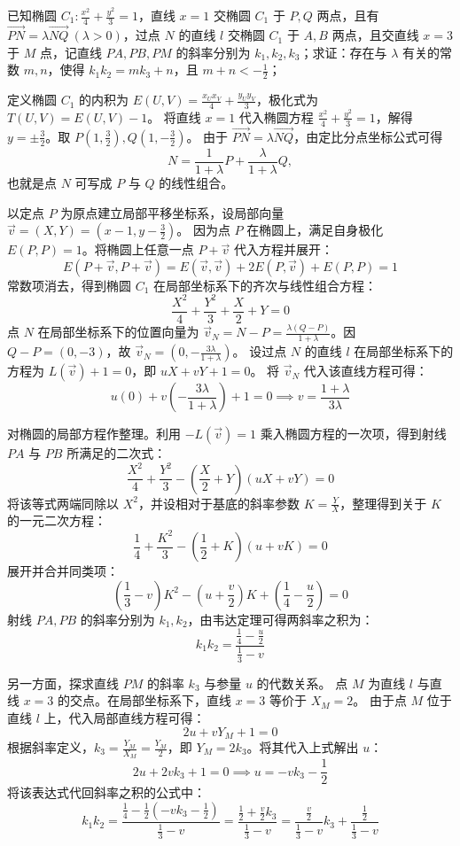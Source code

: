 \begin{exercise}
已知椭圆 \(C_1: \frac{x^2}{4} + \frac{y^2}{3} = 1\)，直线 \(x=1\) 交椭圆 \(C_1\) 于 \(P, Q\) 两点，且有 \(\overrightarrow{PN} = \lambda \overrightarrow{NQ}\ (\lambda > 0)\)，过点 \(N\) 的直线 \(l\) 交椭圆 \(C_1\) 于 \(A, B\) 两点，且交直线 \(x=3\) 于 \(M\) 点，记直线 \(PA, PB, PM\) 的斜率分别为 \(k_1, k_2, k_3\)；求证：存在与 \(\lambda\) 有关的常数 \(m, n\)，使得 \(k_1k_2 = mk_3 + n\)，且 \(m + n < -\frac{1}{2}\)；
\end{exercise}
\begin{solution}
定义椭圆 $C_1$ 的内积为 $E(U,V) = \frac{x_U x_V}{4} + \frac{y_U y_V}{3}$，极化式为 $T(U,V) = E(U,V) - 1$。
将直线 $x=1$ 代入椭圆方程 $\frac{x^2}{4} + \frac{y^2}{3} = 1$，解得 $y = \pm\frac{3}{2}$。取 $P(1, \frac{3}{2}), Q(1, -\frac{3}{2})$。
由于 $\overrightarrow{PN} = \lambda \overrightarrow{NQ}$，由定比分点坐标公式可得
$$N = \frac{1}{1+\lambda} P + \frac{\lambda}{1+\lambda} Q,$$
也就是点 $N$ 可写成 $P$ 与 $Q$ 的线性组合。

以定点 $P$ 为原点建立局部平移坐标系，设局部向量 $\vec{v} = (X, Y) = (x-1, y-\frac{3}{2})$。
因为点 $P$ 在椭圆上，满足自身极化 $E(P,P) = 1$。将椭圆上任意一点 $P+\vec{v}$ 代入方程并展开：
$$ E(P+\vec{v}, P+\vec{v}) = E(\vec{v}, \vec{v}) + 2E(P, \vec{v}) + E(P,P) = 1 $$
常数项消去，得到椭圆 $C_1$ 在局部坐标系下的齐次与线性组合方程：
$$ \frac{X^2}{4} + \frac{Y^2}{3} + \frac{X}{2} + Y = 0 $$
点 $N$ 在局部坐标系下的位置向量为 $\vec{v}_N = N - P = \frac{\lambda(Q-P)}{1+\lambda}$。因 $Q - P = (0, -3)$，故 $\vec{v}_N = \left(0, -\frac{3\lambda}{1+\lambda}\right)$。
设过点 $N$ 的直线 $l$ 在局部坐标系下的方程为 $L(\vec{v}) + 1 = 0$，即 $uX + vY + 1 = 0$。
将 $\vec{v}_N$ 代入该直线方程可得：
$$ u(0) + v\left(-\frac{3\lambda}{1+\lambda}\right) + 1 = 0 \implies v = \frac{1+\lambda}{3\lambda} $$

对椭圆的局部方程作整理。利用 $-L(\vec{v}) = 1$ 乘入椭圆方程的一次项，得到射线 $PA$ 与 $PB$ 所满足的二次式：
$$ \frac{X^2}{4} + \frac{Y^2}{3} - \left(\frac{X}{2} + Y\right)(uX + vY) = 0 $$
将该等式两端同除以 $X^2$，并设相对于基底的斜率参数 $K = \frac{Y}{X}$，整理得到关于 $K$ 的一元二次方程：
$$ \frac{1}{4} + \frac{K^2}{3} - \left(\frac{1}{2} + K\right)(u + vK) = 0 $$
展开并合并同类项：
$$ \left(\frac{1}{3} - v\right)K^2 - \left(u + \frac{v}{2}\right)K + \left(\frac{1}{4} - \frac{u}{2}\right) = 0 $$
射线 $PA, PB$ 的斜率分别为 $k_1, k_2$，由韦达定理可得两斜率之积为：
$$ k_1 k_2 = \frac{\frac{1}{4} - \frac{u}{2}}{\frac{1}{3} - v} $$

另一方面，探求直线 $PM$ 的斜率 $k_3$ 与参量 $u$ 的代数关系。
点 $M$ 为直线 $l$ 与直线 $x=3$ 的交点。在局部坐标系下，直线 $x=3$ 等价于 $X_M = 2$。
由于点 $M$ 位于直线 $l$ 上，代入局部直线方程可得：
$$ 2u + vY_M + 1 = 0 $$
根据斜率定义，$k_3 = \frac{Y_M}{X_M} = \frac{Y_M}{2}$，即 $Y_M = 2k_3$。将其代入上式解出 $u$：
$$ 2u + 2v k_3 + 1 = 0 \implies u = -v k_3 - \frac{1}{2} $$
将该表达式代回斜率之积的公式中：
$$ k_1 k_2 = \frac{\frac{1}{4} - \frac{1}{2}\left(-v k_3 - \frac{1}{2}\right)}{\frac{1}{3} - v} = \frac{\frac{1}{2} + \frac{v}{2}k_3}{\frac{1}{3} - v} = \frac{\frac{v}{2}}{\frac{1}{3} - v} k_3 + \frac{\frac{1}{2}}{\frac{1}{3} - v} $$


\end{solution}

